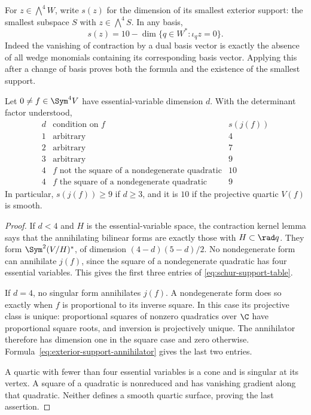 For \(z\in\bigwedge^4W\), write \(s(z)\) for the dimension
of its smallest exterior support: the smallest subspace \(S\)
with \(z\in\bigwedge^4S\).  In any basis,
\begin{equation}\label{eq:exterior-support-annihilator}
 s(z)=10-\dim\{q\in W^*: \iota_qz=0\}.
\end{equation}
Indeed the vanishing of contraction by a dual basis vector is exactly
the absence of all wedge monomials containing its corresponding
basis vector.  Applying this after a change of basis proves both the
formula and the existence of the smallest support.

\begin{proposition}
\label{prop:exact-schur-support}
Let \(0\ne f\in\Sym^4V\) have essential-variable dimension
\(d\).  With the determinant factor understood,
\begin{equation}\label{eq:schur-support-table}
\begin{array}{c|l|c}
 d&\text{condition on }f&s(j(f))\\ \hline
 1&\text{arbitrary}&4\\
 2&\text{arbitrary}&7\\
 3&\text{arbitrary}&9\\
 4&f\text{ not the square of a nondegenerate quadratic}&10\\
 4&f\text{ the square of a nondegenerate quadratic}&9
\end{array}
\end{equation}
In particular, \(s(j(f))\ge9\) if \(d\ge3\), and it is
\(10\) if the projective quartic \(V(f)\) is smooth.
\end{proposition}
\begin{proof}
If \(d<4\) and \(H\) is the essential-variable space, the
contraction kernel lemma says that the annihilating bilinear forms
are exactly those with \(H\subset\rad q\).  They form
\(\Sym^2(V/H)^*\), of dimension \((4-d)(5-d)/2\).
No nondegenerate form can annihilate \(j(f)\), since the square
of a nondegenerate quadratic has four essential variables.
This gives the first three entries of
\eqref{eq:schur-support-table}.

If \(d=4\), no singular form annihilates \(j(f)\).  A
nondegenerate form does so exactly when \(f\) is proportional
to its inverse square.  In this case its projective class is unique:
proportional squares of nonzero quadratics over \(\C\) have
proportional square roots, and inversion is projectively unique.
The annihilator therefore has dimension one in the square case and
zero otherwise.  Formula~\eqref{eq:exterior-support-annihilator}
gives the last two entries.

A quartic with fewer than four essential variables is a cone and is
singular at its vertex.  A square of a quadratic is nonreduced and
has vanishing gradient along that quadratic.  Neither defines a
smooth quartic surface, proving the last assertion.
\end{proof}

